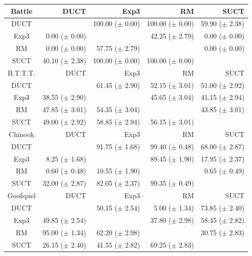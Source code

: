 \documentclass[conference]{IEEEtran}
\begin{document}
\begin{table}
\begin{center}
{\setlength{\tabcolsep}{0.62em}
\begin{tabular}{|c|rrrr|}
\hline
         Battle   &       DUCT   &       Exp3   &         RM   &       SUCT   \\
\hline
           DUCT    &              & 100.00 ($\pm$ 0.00)   & 100.00 ($\pm$ 0.00)   & 59.90 ($\pm$ 2.38)   \\
           Exp3    & 0.00 ($\pm$ 0.00)   &              & 42.25 ($\pm$ 2.79)   & 0.00 ($\pm$ 0.00)   \\
             RM    & 0.00 ($\pm$ 0.00)   & 57.75 ($\pm$ 2.79)   &              & 0.00 ($\pm$ 0.00)   \\
           SUCT    & 40.10 ($\pm$ 2.38)   & 100.00 ($\pm$ 0.00)   & 100.00 ($\pm$ 0.00)   &              \\

\hline
\hline
B.T.T.T.   &       DUCT   &       Exp3   &         RM   &       SUCT   \\
\hline

           DUCT    &              & 61.45 ($\pm$ 2.90)   & 52.15 ($\pm$ 3.01)   & 51.00 ($\pm$ 2.92)   \\
           Exp3    & 38.55 ($\pm$ 2.90)   &              & 45.65 ($\pm$ 3.04)   & 41.15 ($\pm$ 2.94)   \\
             RM    & 47.85 ($\pm$ 3.01)   & 54.35 ($\pm$ 3.04)   &              & 43.85 ($\pm$ 3.01)   \\
           SUCT    & 49.00 ($\pm$ 2.92)   & 58.85 ($\pm$ 2.94)   & 56.15 ($\pm$ 3.01)   &              \\
\hline
\hline
        Chinook   &       DUCT   &       Exp3   &         RM   &       SUCT   \\
\hline
           DUCT    &              & 91.75 ($\pm$ 1.68)   & 99.40 ($\pm$ 0.48)   & 68.00 ($\pm$ 2.87)   \\
           Exp3    & 8.25 ($\pm$ 1.68)   &              & 89.45 ($\pm$ 1.90)   & 17.95 ($\pm$ 2.37)   \\
             RM    & 0.60 ($\pm$ 0.48)   & 10.55 ($\pm$ 1.90)   &              & 0.65 ($\pm$ 0.49)   \\
           SUCT    & 32.00 ($\pm$ 2.87)   & 82.05 ($\pm$ 2.37)   & 99.35 ($\pm$ 0.49)   &              \\

\hline
\hline
      Goofspiel   &       DUCT   &       Exp3   &         RM   &       SUCT   \\
\hline
           DUCT    &              & 50.15 ($\pm$ 2.54)   & 5.00 ($\pm$ 1.34)   & 73.85 ($\pm$ 2.40)   \\
           Exp3    & 49.85 ($\pm$ 2.54)   &              & 37.80 ($\pm$ 2.98)   & 58.45 ($\pm$ 2.82)   \\
             RM    & 95.00 ($\pm$ 1.34)   & 62.20 ($\pm$ 2.98)   &              & 30.75 ($\pm$ 2.83)   \\
           SUCT    & 26.15 ($\pm$ 2.40)   & 41.55 ($\pm$ 2.82)   & 69.25 ($\pm$ 2.83)   &              \\


\end{tabular}}
\end{center}
\end{table}
\end{document}
